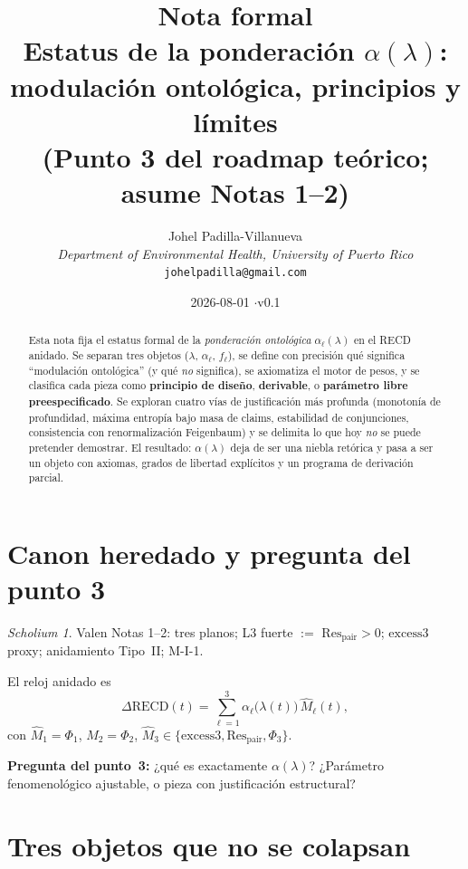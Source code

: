 \documentclass[11pt,a4paper]{article}
\title{\textbf{Nota formal}\\[0.4em]
\large Estatus de la ponderaci\'on $\alpha(\lambda)$:\\
modulación ontológica, principios y l\'imites\\[0.6em]
\normalsize (Punto 3 del roadmap te\'orico; asume Notas 1--2)}
\author{
Johel Padilla-Villanueva\\
\textit{Department of Environmental Health, University of Puerto Rico}\\
\texttt{johelpadilla@gmail.com}
}
\date{2026-08-01 \quad$\cdot$\quad v0.1}
\theoremstyle{definition}
\theoremstyle{plain}
\theoremstyle{remark}
\newtheorem{scholium}{Scholium}[section]
\newcommand{\Res}{\mathrm{Res}}
\newcommand{\RECD}{\mathrm{RECD}}
\newcommand{\excess}{\mathrm{excess3}}
\begin{document}
\maketitle

\begin{abstract}
Esta nota fija el estatus formal de la \emph{ponderaci\'on ontológica}
$\alpha_\ell(\lambda)$ en el RECD anidado. Se separan tres objetos
($\lambda$, $\alpha_\ell$, $f_\ell$), se define con precisi\'on qu\'e
significa ``modulación ontológica'' (y qu\'e \emph{no} significa), se
axiomatiza el motor de pesos, y se clasifica cada pieza como
\textbf{principio de dise\~no}, \textbf{derivable}, o \textbf{par\'ametro
libre preespecificado}. Se exploran cuatro v\'ias de justificación m\'as
profunda (monoton\'ia de profundidad, m\'axima entrop\'ia bajo masa de
claims, estabilidad de conjunciones, consistencia con renormalización
Feigenbaum) y se delimita lo que hoy \emph{no} se puede pretender
demostrar. El resultado: $\alpha(\lambda)$ deja de ser una niebla
retórica y pasa a ser un objeto con axiomas, grados de libertad
explícitos y un programa de derivación parcial.
\end{abstract}

\tableofcontents
\vspace{1em}

\section{Canon heredado y pregunta del punto 3}
\label{sec:q}

\begin{scholium}
Valen Notas 1--2: tres planos; L3 fuerte $:=$ $\Res_{\mathrm{pair}}>0$;
$\excess$ proxy; anidamiento Tipo~II; M-I-1.
\end{scholium}

El reloj anidado es
\begin{equation}
\label{eq:drecd}
\Delta\RECD(t)
=\sum_{\ell=1}^{3}\alpha_\ell\bigl(\lambda(t)\bigr)\,
\widehat{M}_\ell(t),
\end{equation}
con $\widehat{M}_1=\Phi_1$, $\widehat{M}_2=\Phi_2$,
$\widehat{M}_3\in\{\excess,\Res_{\mathrm{pair}},\Phi_3\}$.

\textbf{Pregunta del punto~3:}
¿qu\'e es exactamente $\alpha(\lambda)$? ¿Par\'ametro fenomenológico
ajustable, o pieza con justificación estructural?

\section{Tres objetos que no se colapsan}
\label{sec:three}
\end{document}
